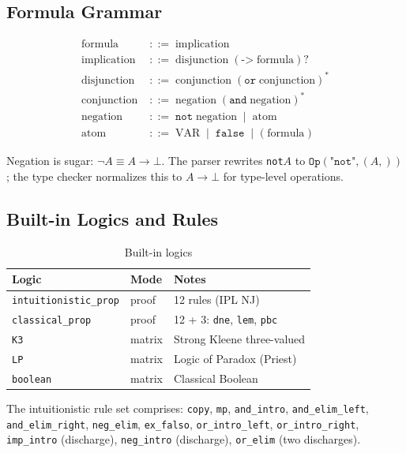 \documentclass[11pt,a4paper]{article}
\theoremstyle{definition}
\theoremstyle{plain}
\begin{document}
\subsection{Formula Grammar}

\begin{align*}
  \text{formula} &\;::=\; \text{implication} \\
  \text{implication} &\;::=\; \text{disjunction}
    \;(\texttt{->}\;\text{formula})? \\
  \text{disjunction} &\;::=\;
    \text{conjunction}\;(\texttt{or}\;\text{conjunction})^* \\
  \text{conjunction} &\;::=\;
    \text{negation}\;(\texttt{and}\;\text{negation})^* \\
  \text{negation} &\;::=\; \texttt{not}\;\text{negation}
    \;\mid\; \text{atom} \\
  \text{atom} &\;::=\; \text{VAR} \;\mid\; \texttt{false}
    \;\mid\; \texttt{(}\;\text{formula}\;\texttt{)}
\end{align*}

Negation is sugar: $\lnot A \equiv A \to \bot$.
The parser rewrites \texttt{not}\;$A$ to
$\texttt{Op}(\texttt{"not"}, (A,))$; the type checker
normalizes this to $A \to \bot$ for type-level operations.

\subsection{Built-in Logics and Rules}

\begin{table}[H]
\centering
\caption{Built-in logics}
\begin{tabular}{@{}lll@{}}
\toprule
Logic & Mode & Notes \\
\midrule
\texttt{intuitionistic\_prop} & proof & 12 rules (IPL NJ) \\
\texttt{classical\_prop} & proof & 12 + 3: \texttt{dne}, \texttt{lem}, \texttt{pbc} \\
\texttt{K3} & matrix & Strong Kleene three-valued \\
\texttt{LP} & matrix & Logic of Paradox (Priest) \\
\texttt{boolean} & matrix & Classical Boolean \\
\bottomrule
\end{tabular}
\end{table}

The intuitionistic rule set comprises: \texttt{copy}, \texttt{mp},
\texttt{and\_intro}, \texttt{and\_elim\_left},
\texttt{and\_elim\_right}, \texttt{neg\_elim},
\texttt{ex\_falso}, \texttt{or\_intro\_left},
\texttt{or\_intro\_right}, \texttt{imp\_intro} (discharge),
\texttt{neg\_intro} (discharge), \texttt{or\_elim}
(two discharges).
\end{document}
